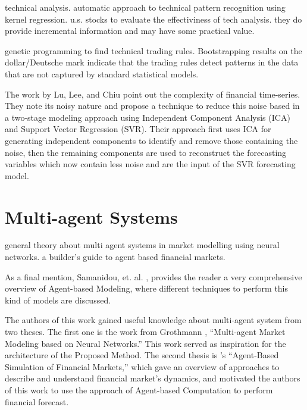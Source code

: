 \cite{Lo2000} technical analysis. automatic approach to technical pattern
recognition using kernel regression. u.s. stocks to evaluate the effectiviness
of tech analysis. they do provide incremental information and may have some
practical value.

\cite{Neely1997} genetic programming to find technical trading
rules. Bootstrapping results on the dollar/Deutsche mark indicate that the
trading rules detect patterns in the data that are not captured by standard
statistical models.

The work by Lu, Lee, and Chiu \cite{Lu2009} point out the complexity of
financial time-series. They note its noisy nature and propose a technique to
reduce this noise based in a two-stage modeling approach using Independent
Component Analysis (ICA) and Support Vector Regression (SVR). Their approach
first uses ICA for generating independent components to identify and remove
those containing the noise, then the remaining components are used to
reconstruct the forecasting variables which now contain less noise and are the
input of the SVR forecasting model.

\section{Multi-agent Systems}
\label{section:multi-agent-systems}
\cite{Grothmann2002} general theory about multi agent systems in market
modelling using neural networks.  \cite{Lebaron2001} a builder's guide to agent
based financial markets.

As a final mention, Samanidou, et. al. \cite{Samanidou_2007}, provides the
reader a very comprehensive overview of Agent-based Modeling, where different
techniques to perform this kind of models are discussed.

The authors of this work gained useful knowledge about multi-agent system from
two theses. The first one is the work from Grothmann \cite{Grothmann2002},
``Multi-agent Market Modeling based on Neural Networks.'' This work served as
inspiration for the architecture of the Proposed Method. The second thesis is
\cite{Boer-Sorban2008}'s ``Agent-Based Simulation of Financial Markets,'' which
gave an overview of approaches to describe and understand financial market's
dynamics, and motivated the authors of this work to use the approach of
Agent-based Computation to perform financial forecast.

